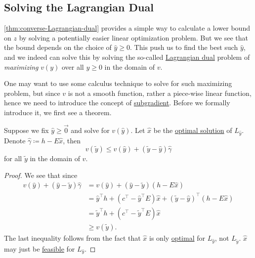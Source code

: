 \subsection{Solving the Lagrangian Dual}
\begin{intuition}
	\autoref{thm:converse-Lagrangian-dual} provides a simple way to calculate a lower bound on \(z\) by solving a potentially easier linear optimization problem. But we see that the bound depends on the choice of \(\hat{y}\geq 0\). This push us to find the best such \(\hat{y}\), and we indeed can solve this by solving the so-called \hyperref[def:Lagrangian-dual]{Lagrangian dual} problem of \emph{maximizing} \(v(y)\) over all \(y\geq 0\) in the domain of \(v\).
\end{intuition}

One may want to use some calculus technique to solve for such maximizing problem, but since \(v\) is not a smooth function, rather a piece-wise linear function, hence we need to introduce the concept of \hyperref[def:subgradient]{subgradient}. Before we formally introduce it, we first see a theorem.

\begin{theorem}\label{thm:lec19-1}
	Suppose we fix \(\hat{y}\geq \vec{0}\) and solve for \(v(\hat{y})\). Let \(\hat{x}\) be the \hyperref[def:optimal-solution]{optimal solution} of \(L_{\hat{y}}\). Denote \(\hat{\gamma}\coloneqq h - E \hat{x}\), then
	\[
		v(\widetilde{y})\leq v(\hat{y})+(\widetilde{y} - \hat{y})\hat{\gamma}
	\]
	for all \(\widetilde{y}\) in the domain of \(v\).
	\begin{center}
	\end{center}
\end{theorem}

\begin{proof}
	We see that since
	\[
		\begin{split}
			v(\hat{y})+(\hat{y} - \widetilde{y})\hat{\gamma}&=v(\hat{y})+(\hat{y} - \widetilde{y})(h - E \hat{x})\\
			&= \hat{y}^{\top}h + (c^{\top} - \hat{y}^{\top}E)\hat{x} + (\widetilde{y} - \hat{y})^{\top}(h - E \hat{x})\\
			&= \widetilde{y}^{\top}h + (c^{\top} - \widetilde{y}^{\top} E)\hat{x}\\
			&\geq v(\widetilde{y}).
		\end{split}
	\]
	The last inequality follows from the fact that \(\hat{x}\) is only \hyperref[def:optimal-solution]{optimal} for \(L_{\hat{y}}\), not \(L_{\widetilde{y}}\). \(\hat{x}\) may just be \hyperref[def:feasible-solution]{feasible} for \(L_{\hat{y}}\).
\end{proof}


